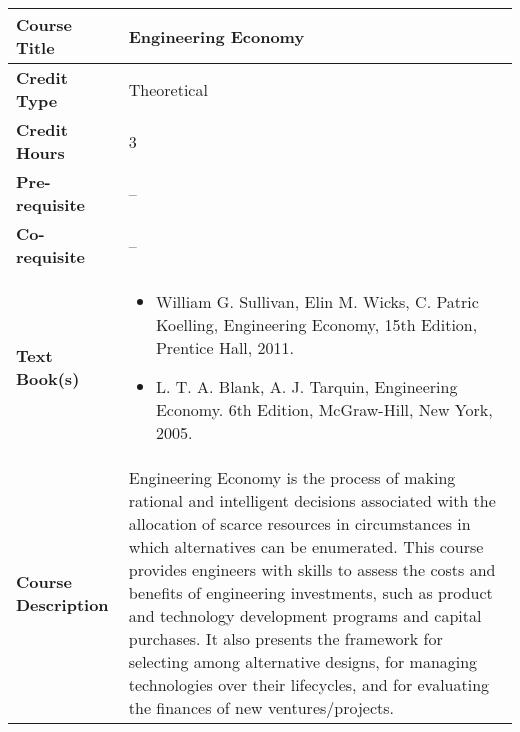 \documentclass[11pt]{article}
\begin{document}
\begin{table}[h!]
\begin{tabular}{|l|l|}
\hline
\textbf{Course Title}       &  Engineering Economy \\ \hline
\textbf{Credit Type}        &   Theoretical \\ \hline
\textbf{Credit Hours}       &  3 \\ \hline
\textbf{Pre-requisite}       & -- \\ \hline
\textbf{Co-requisite}       & -- \\ \hline
\textbf{Text Book(s)}       & \begin{minipage}{.70\textwidth}
\begin{itemize} \itemsep-0.4em
	\vspace{3mm}
	\item William G. Sullivan, Elin M. Wicks, C. Patric Koelling, Engineering Economy, 15th Edition, Prentice Hall, 2011.
	\item L. T. A. Blank, A. J. Tarquin, Engineering Economy. 6th Edition, McGraw-Hill, New York, 2005.
	\vspace{3mm}
\end{itemize}
\end{minipage}\\ \hline
\textbf{Course Description} & \begin{minipage}{.70\textwidth}
\vspace{3mm}
Engineering Economy is the process of making rational and intelligent decisions associated with the allocation of
scarce resources in circumstances in which alternatives can be enumerated. This course provides engineers with
skills to assess the costs and benefits of engineering investments, such as product and technology development
programs and capital purchases. It also presents the framework for selecting among alternative designs, for
managing technologies over their lifecycles, and for evaluating the finances of new ventures/projects.

\vspace{3mm}
\end{minipage} \\ \hline
\end{tabular}
\end{table}
\end{document}
